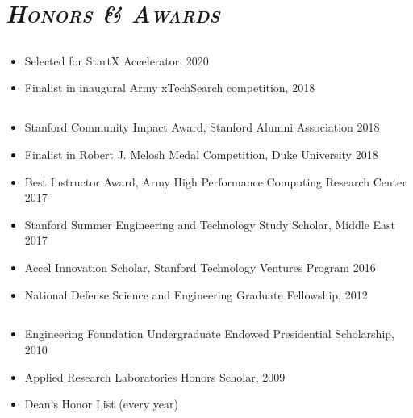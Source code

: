 \documentclass[10pt]{article}
\begin{document}
\section*{\sl {\bfseries{\textsc{\large Honors \& Awards}}}}

\subsection*{\sl \normalsize \underline{}}
\begin{itemize}
	\setlength{\itemsep}{0pt}
	\setlength{\parskip}{0pt}
	\item Selected for StartX Accelerator, 2020
	\item Finalist in inaugural Army xTechSearch competition, 2018
\end{itemize}

\subsection*{\sl \normalsize \underline{}} 
\begin{itemize}
	\setlength{\itemsep}{0pt}
	\setlength{\parskip}{0pt}
	\item Stanford Community Impact Award, Stanford Alumni Association 2018
	\item Finalist in Robert J. Melosh Medal Competition, Duke University 2018
	\item Best Instructor Award, Army High Performance Computing Research Center 2017
	\item Stanford Summer Engineering and Technology Study Scholar, Middle East 2017
	\item Accel Innovation Scholar, Stanford Technology Ventures Program 2016
	\item National Defense Science and Engineering Graduate Fellowship, 2012
\end{itemize}

\subsection*{\sl \normalsize \underline{}}
\begin{itemize}
	\setlength{\itemsep}{0pt}
	\setlength{\parskip}{0pt}
	\item Engineering Foundation Undergraduate Endowed Presidential Scholarship, 2010 	
	\item Applied Research Laboratories Honors Scholar, 2009 
	\item Dean's Honor List (every year) 
\end{itemize}
\end{document}
